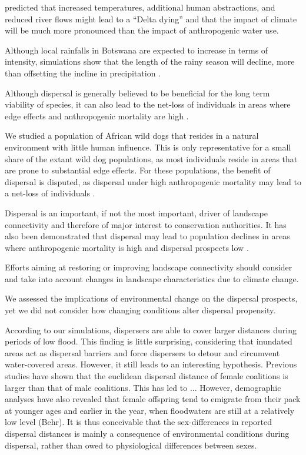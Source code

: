 \documentclass[abstract=on,10pt,a4paper,bibliography=totocnumbered]{article}
\begin{document}
\cite{Murray-Hudson.2006} predicted that increased temperatures, additional human
abstractions, and reduced river flows might lead to a ``Delta dying'' and that
the impact of climate will be much more pronounced than the impact of
anthropogenic water use.

Although local rainfalls in Botswana are expected to increase in terms of
intensity, simulations show that the length of the rainy season will decline,
more than offsetting the incline in precipitation \cite{Akinyemi.2019}.

Although dispersal is generally believed to be beneficial for the long term
viability of species, it can also lead to the net-loss of individuals in areas
where edge effects and anthropogenic mortality are high \citep{Leigh.2012}.

We studied a population of African wild dogs that resides in a natural
environment with little human influence. This is only representative for a small
share of the extant wild dog populations, as most individuals reside in areas
that are prone to substantial edge effects. For these populations, the benefit
of dispersal is disputed, as dispersal under high anthropogenic mortality may
lead to a net-loss of individuals \citep{Leigh.2012}.

Dispersal is an important, if not the most important, driver of landscape
connectivity and therefore of major interest to conservation authorities. It has
also been demonstrated that dispersal may lead to population declines in areas
where anthropogenic mortality is high and dispersal prospects low
\citep{Leigh.2012}.


Efforts aiming at restoring or improving landscape connectivity should consider
and take into account changes in landscape characteristics due to climate
change.

We assessed the implications of environmental change on the dispersal prospects,
yet we did not consider how changing conditions alter dispersal propensity.

According to our simulations, dispersers are able to cover larger distances
during periods of low flood. This finding is little surprising, considering that
inundated areas act as dispersal barriers and force dispersers to detour and
circumvent water-covered areas. However, it still leads to an interesting
hypothesis. Previous studies have shown that the euclidean dispersal distance of
female coalitions is larger than that of male coalitions. This has led to ...
However, demographic analyses have also revealed that female offspring tend to
emigrate from their pack at younger ages and earlier in the year, when
floodwaters are still at a relatively low level (Behr). It is thus conceivable
that the sex-differences in reported dispersal distances is mainly a consequence
of environmental conditions during dispersal, rather than owed to physiological
differences between sexes.
\end{document}
